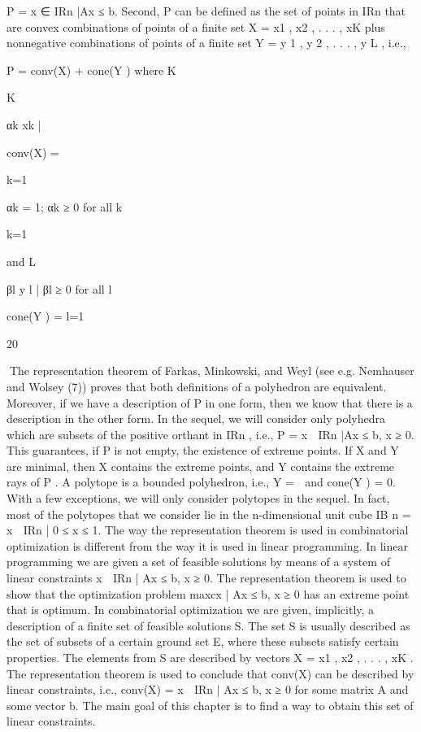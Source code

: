\documentclass[titlepage]{book}
\theoremstyle{definition}
\begin{document}
P = {x ∈ IRn |Ax ≤ b}.
Second, P can be defined as the set of points in IRn that are convex combinations of points of a finite set
X = {x1 , x2 , . . . , xK } plus nonnegative combinations of points of a finite set Y = {y 1 , y 2 , . . . , y L }, i.e.,

P = conv(X) + cone(Y )
where
K

K

αk xk |

conv(X) = {
k=1

αk = 1; αk ≥ 0 for all k}
k=1

and
L

βl y l | βl ≥ 0 for all l

cone(Y ) = 
l=1

20

The representation theorem of Farkas, Minkowski, and Weyl (see e.g. Nemhauser and Wolsey (7)) proves
that both definitions of a polyhedron are equivalent. Moreover, if we have a description of P in one form,
then we know that there is a description in the other form.
In the sequel, we will consider only polyhedra which are subsets of the positive orthant in IRn , i.e.,
P = {x ∈ IRn |Ax ≤ b, x ≥ 0}. This guarantees, if P is not empty, the existence of extreme points. If
X and Y are minimal, then X contains the extreme points, and Y contains the extreme rays of P . A
polytope is a bounded polyhedron, i.e., Y = ∅ and cone(Y ) = {0}. With a few exceptions, we will only
consider polytopes in the sequel. In fact, most of the polytopes that we consider lie in the n-dimensional
unit cube IB n = {x ∈ IRn | 0 ≤ x ≤ 1}.
The way the representation theorem is used in combinatorial optimization is different from the way it
is used in linear programming. In linear programming we are given a set of feasible solutions by means
of a system of linear constraints {x ∈ IRn | Ax ≤ b, x ≥ 0}. The representation theorem is used to
show that the optimization problem max{cx | Ax ≤ b, x ≥ 0} has an extreme point that is optimum.
In combinatorial optimization we are given, implicitly, a description of a finite set of feasible solutions
S. The set S is usually described as the set of subsets of a certain ground set E, where these subsets
satisfy certain properties. The elements from S are described by vectors X = {x1 , x2 , . . . , xK }. The
representation theorem is used to conclude that conv(X) can be described by linear constraints, i.e.,
conv(X) = {x ∈ IRn | Ax ≤ b, x ≥ 0} for some matrix A and some vector b. The main goal of this
chapter is to find a way to obtain this set of linear constraints.
\end{document}
